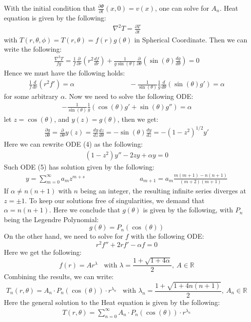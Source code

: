 \documentclass[11pt]{article}
\theoremstyle{break}
\theoremstyle{break}
\newcommand{\R}{\mathbb{R}}
\newcommand{\pd}{\partial}
\begin{document}
With the initial condition that $\frac{\partial \Phi}{\partial t}(x,0) = v(x)$, one can solve for $A_n$. 
\hfill\break\hfill\break\hfill\break
Heat equation is given by the following:
\begin{align*}
\nabla^2 T = \frac{\partial T}{\partial t}
\end{align*}
with $T(r,\theta,\phi) = T(r,\theta) = f(r)g(\theta)$ in Spherical Coordinate. Then we can write the following:
\begin{align*}
\frac{\nabla^2 T}{fg} = \frac{1}{f}\frac{\partial}{\partial r}\left( r^2 \frac{df}{dr}\right) + \frac{1}{g\sin(\theta)}\frac{\partial }{\partial \theta}\left( \sin(\theta) \frac{dg}{d\theta}\right) = 0
\end{align*}
Hence we must have the following holds:
\begin{align*}
\frac{1}{f}  \frac{d}{dr}\left( r^2 f'\right) = \alpha \qquad\qquad\qquad\qquad -\frac{1}{\sin(\theta)}\frac{1}{g}\frac{d}{d\theta}(\sin(\theta) g') = \alpha
\end{align*}
for some arbitrary $\alpha$. Now we need to solve the following ODE:
\begin{align*}
-\frac{1}{\sin(\theta)}\frac{1}{g}\left( \cos(\theta) g' + \sin(\theta) g''\right) = \alpha \tag{4}
\end{align*}
let $z = \cos(\theta)$, and $y(z) = g(\theta)$, then we get:
\begin{align*}
\frac{\pd g}{\pd \theta} = \frac{\pd}{\pd\theta} y(z) = \frac{dy}{dz}\frac{d z}{d \theta} = -\sin(\theta) \frac{dy}{dz} = -(1-z^2)^{1/2} y'
\end{align*}
Here we can rewrite ODE (4) as the following:
\begin{align*}
(1-z^2)y'' - 2zy + \alpha y = 0 \tag{5}
\end{align*}
Such ODE (5) has solution given by the following:
\begin{align*}
y = \sum_{m=0}^\infty a_m z^{m+s} \qquad\qquad\qquad\qquad a_{m+1} = a_m \frac{m(m+1)-n(n+1)}{(m+2)(m+1)}
\end{align*}
If $\alpha \neq n(n+1)$ with $n$ being an integer, the resulting infinite series diverges at $z = \pm 1 $. To keep our solutions free of singularities, we demand that $\alpha=n(n+1)$. Here we conclude that $g(\theta)$ is given by the following, with $P_n$ being the Legendre Polynomial:
$$g(\theta) = P_n(\cos(\theta))$$
On the other hand, we need to solve for $f$ with the following ODE:
$$r^2 f'' + 2rf' - \alpha f = 0$$
Here we get the following:
$$f(r) = Ar^\lambda \ \ \ \ \text{with }\lambda = \frac{1+\sqrt{1+4\alpha}}{2},\ A \in \R$$
Combining the results, we can write:
$$T_n(r,\theta) = A_n\cdot  P_n(\cos(\theta))\cdot r^{\lambda_n}\ \ \ \ \text{with }\lambda_n = \frac{1+\sqrt{1+4n(n+1)}}{2},\ A_n \in \R$$
Here the general solution to the Heat equation is given by the following:
\begin{align*}
T(r,\theta) = \sum_{n=0}^\infty A_n \cdot P_n(\cos(\theta)) \cdot r^{\lambda_n}
\end{align*}
\end{document}
